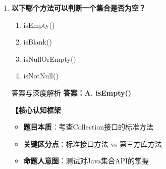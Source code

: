 \documentclass[12pt, a4paper]{ctexart}
\begin{document}
\begin{enumerate}[label=\textbf{\arabic*.}]
\begin{bluebox}{答案与深度解析}
\begin{itemize}[leftmargin=*, nosep, label={}]
\begin{itemize}[label={}, leftmargin=*, nosep]
\begin{lstlisting}[language=Java]
// JDK8+：数组 + 链表 + 红黑树
static final int TREEIFY_THRESHOLD = 8;
static final int UNTREEIFY_THRESHOLD = 6;
				      \end{lstlisting}
				            \item \textbf{性能特性}：增删改查平均O(1)
			            \end{itemize}
		      \end{itemize}

		      \textbf{【应背诵知识点}
		      \begin{itemize}[label={}, nosep]
			      \item HashMap：线程不安全、基于哈希表、键唯一
			      \item ConcurrentHashMap：线程安全、分段锁
			      \item Hashtable：线程安全、全表锁（性能差）
			      \item 选项辨析：HashMap=不安全，ConcurrentHashMap=安全
		      \end{itemize}

		      \textbf{【命题趋势与实战策略】}

		      \textbf{考场秒杀}：看到HashMap选"线程安全"→必错，选"线程不安全"→必对
	      \end{bluebox}

	      \vspace{1em}

	\item \textbf{以下哪个方法可以判断一个集合是否为空？}
	      \begin{enumerate}[label=\Alph*.]
		      \item isEmpty()
		      \item isBlank()
		      \item isNullOrEmpty()
		      \item isNotNull()
	      \end{enumerate}

	      \begin{bluebox}{答案与深度解析}
		      \textbf{答案：A. isEmpty()}

		      \textbf{【核心认知框架}
		      \begin{itemize}[label={}, leftmargin=*, nosep]
			      \item \textbf{题目本质}：考查Collection接口的标准方法
			      \item \textbf{关键区分点}：标准接口方法 vs 第三方库方法
			      \item \textbf{命题人意图}：测试对Java集合API的掌握
		      \end{itemize}


\end{bluebox}
\end{enumerate}
\end{document}
